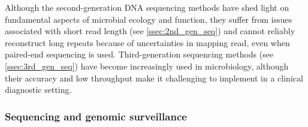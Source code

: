 Although the second-generation DNA sequencing methods have shed light on fundamental aspects of microbial ecology and function, they suffer from issues associated with short read length (see \ref{ssec:2nd_gen_seq}) and cannot reliably reconstruct long repeats because of uncertainties in mapping read, even when paired-end sequencing is used. Third-generation sequencing methods (see \ref{ssec:3rd_gen_seq}) have become increasingly used in microbiology, although their accuracy and low throughput make it challenging to implement in a clinical diagnostic setting. %

\subsubsection{Sequencing and genomic surveillance} \label{sssec:sequencing_genomic_survaillance}

